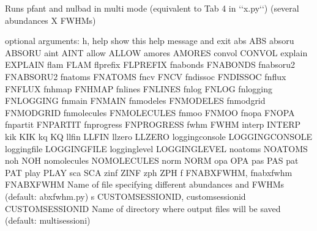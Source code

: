 \documentclass[letterpaper,10pt,english]{sphinxmanual}
\begin{document}
\begin{sphinxVerbatim}[commandchars=\\\{\}]
Runs pfant and nulbad in \PYGZdq{}multi mode\PYGZdq{} (equivalent to Tab 4 in {}`{}`x.py{}`{}`) (several abundances X FWHM\PYGZsq{}s)

optional arguments:
  \PYGZhy{}h, \PYGZhy{}\PYGZhy{}help            show this help message and exit
  \PYGZhy{}\PYGZhy{}abs ABS
  \PYGZhy{}\PYGZhy{}absoru ABSORU
  \PYGZhy{}\PYGZhy{}aint AINT
  \PYGZhy{}\PYGZhy{}allow ALLOW
  \PYGZhy{}\PYGZhy{}amores AMORES
  \PYGZhy{}\PYGZhy{}convol CONVOL
  \PYGZhy{}\PYGZhy{}explain EXPLAIN
  \PYGZhy{}\PYGZhy{}flam FLAM
  \PYGZhy{}\PYGZhy{}flprefix FLPREFIX
  \PYGZhy{}\PYGZhy{}fn\PYGZus{}abonds FN\PYGZus{}ABONDS
  \PYGZhy{}\PYGZhy{}fn\PYGZus{}absoru2 FN\PYGZus{}ABSORU2
  \PYGZhy{}\PYGZhy{}fn\PYGZus{}atoms FN\PYGZus{}ATOMS
  \PYGZhy{}\PYGZhy{}fn\PYGZus{}cv FN\PYGZus{}CV
  \PYGZhy{}\PYGZhy{}fn\PYGZus{}dissoc FN\PYGZus{}DISSOC
  \PYGZhy{}\PYGZhy{}fn\PYGZus{}flux FN\PYGZus{}FLUX
  \PYGZhy{}\PYGZhy{}fn\PYGZus{}hmap FN\PYGZus{}HMAP
  \PYGZhy{}\PYGZhy{}fn\PYGZus{}lines FN\PYGZus{}LINES
  \PYGZhy{}\PYGZhy{}fn\PYGZus{}log FN\PYGZus{}LOG
  \PYGZhy{}\PYGZhy{}fn\PYGZus{}logging FN\PYGZus{}LOGGING
  \PYGZhy{}\PYGZhy{}fn\PYGZus{}main FN\PYGZus{}MAIN
  \PYGZhy{}\PYGZhy{}fn\PYGZus{}modeles FN\PYGZus{}MODELES
  \PYGZhy{}\PYGZhy{}fn\PYGZus{}modgrid FN\PYGZus{}MODGRID
  \PYGZhy{}\PYGZhy{}fn\PYGZus{}molecules FN\PYGZus{}MOLECULES
  \PYGZhy{}\PYGZhy{}fn\PYGZus{}moo FN\PYGZus{}MOO
  \PYGZhy{}\PYGZhy{}fn\PYGZus{}opa FN\PYGZus{}OPA
  \PYGZhy{}\PYGZhy{}fn\PYGZus{}partit FN\PYGZus{}PARTIT
  \PYGZhy{}\PYGZhy{}fn\PYGZus{}progress FN\PYGZus{}PROGRESS
  \PYGZhy{}\PYGZhy{}fwhm FWHM
  \PYGZhy{}\PYGZhy{}interp INTERP
  \PYGZhy{}\PYGZhy{}kik KIK
  \PYGZhy{}\PYGZhy{}kq KQ
  \PYGZhy{}\PYGZhy{}llfin LLFIN
  \PYGZhy{}\PYGZhy{}llzero LLZERO
  \PYGZhy{}\PYGZhy{}logging\PYGZus{}console LOGGING\PYGZus{}CONSOLE
  \PYGZhy{}\PYGZhy{}logging\PYGZus{}file LOGGING\PYGZus{}FILE
  \PYGZhy{}\PYGZhy{}logging\PYGZus{}level LOGGING\PYGZus{}LEVEL
  \PYGZhy{}\PYGZhy{}no\PYGZus{}atoms NO\PYGZus{}ATOMS
  \PYGZhy{}\PYGZhy{}no\PYGZus{}h NO\PYGZus{}H
  \PYGZhy{}\PYGZhy{}no\PYGZus{}molecules NO\PYGZus{}MOLECULES
  \PYGZhy{}\PYGZhy{}norm NORM
  \PYGZhy{}\PYGZhy{}opa OPA
  \PYGZhy{}\PYGZhy{}pas PAS
  \PYGZhy{}\PYGZhy{}pat PAT
  \PYGZhy{}\PYGZhy{}play PLAY
  \PYGZhy{}\PYGZhy{}sca SCA
  \PYGZhy{}\PYGZhy{}zinf ZINF
  \PYGZhy{}\PYGZhy{}zph ZPH
  \PYGZhy{}f FN\PYGZus{}ABXFWHM, \PYGZhy{}\PYGZhy{}fn\PYGZus{}abxfwhm FN\PYGZus{}ABXFWHM
                        Name of file specifying different abundances and
                        FWHM\PYGZsq{}s (default: abxfwhm.py)
  \PYGZhy{}s CUSTOM\PYGZus{}SESSION\PYGZus{}ID, \PYGZhy{}\PYGZhy{}custom\PYGZus{}session\PYGZus{}id CUSTOM\PYGZus{}SESSION\PYGZus{}ID
                        Name of directory where output files will be saved
                        (default: multi\PYGZhy{}session\PYGZhy{}\PYGZlt{}i\PYGZgt{})
\end{sphinxVerbatim}
\end{document}
